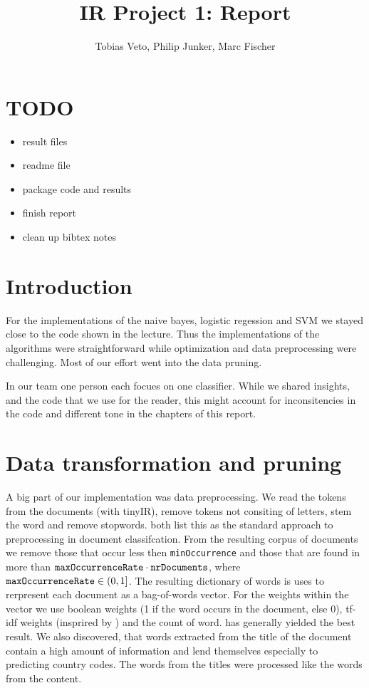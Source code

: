 \documentclass{article}
\title{IR Project 1: Report}
\author{Tobias Veto, Philip Junker, Marc Fischer}
\begin{document}
\section*{TODO}
\begin{itemize}
	\item result files
	\item readme file
	\item package code and results
	\item finish report
	\item clean up bibtex notes
\end{itemize}

 
\section*{Introduction}
For the implementations of the naive bayes, logistic regession and SVM we stayed close to the code shown in the lecture. Thus the implementations of the algorithms were straightforward while optimization and data preprocessing were challenging. Most of our effort went into the data pruning.

In our team one person each focues on one classifier. While we shared insights, and the code that we use for the reader, this might account for inconsitencies in the code and different tone in the chapters of this report.


\section*{Data transformation and pruning}
A big part of our implementation was data preprocessing. We read the tokens from the documents (with tinyIR), remove tokens not consiting of letters, stem the word and remove stopwords. \cite{joachims_text_1998,ozgur_text_2005} both list this as the standard approach to preprocessing in document classifcation. From the resulting corpus of documents we remove those that occur less then \texttt{minOccurrence} and those that are found in more than $\text{\texttt{maxOccurrenceRate}} \cdot \text{\texttt{nrDocuments}}$, where $\text{\texttt{maxOccurrenceRate}} \in (0, 1]$.
The resulting dictionary of words is uses to rerpresent each document as a bag-of-words vector. For the weights within the vector we use boolean weights (1 if the word occurs in the document, else 0), tf-idf weights (insprired by \cite{ozgur_text_2005}) and the count of word.   has generally yielded the best result.
We also discovered, that words extracted from the title of the document contain a high amount of information and lend themselves especially to predicting country codes. The words from the titles were processed like the words from the content.
\end{document}
